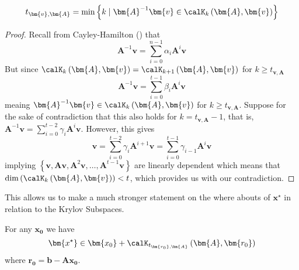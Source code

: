 \begin{cor} \label{theorem: grade_as_min}
    \[
        t_{\bm{v}, \bm{A}} = \min \left\{k \mid \bm{A}^{-1} \bm{v} \in \calK_{k} \left( \bm{A},\bm{v} \right) \right\}
    \]
\end{cor}
\begin{proof}
    Recall from Cayley-Hamilton () that
    \[
        \bm{A}^{-1} \bm{v} = \sum_{i=0}^{n-1} \alpha_{i} \bm{A}^{i} \bm{v}
    \]
    But since $\calK_{k} \left( \bm{A},\bm{v} \right) = \calK_{k+1} \left( \bm{A},\bm{v} \right)$ for $k \geq t_{\bm{v}, \bm{A}}$
    \[
        \bm{A}^{-1} \bm{v} = \sum_{i=0}^{t-1} \beta_{i} \bm{A}^{i} \bm{v}
    \]
    meaing $\bm{A}^{-1} \bm{v} \in \calK_{k} \left( \bm{A},\bm{v} \right)$ for $k \geq t_{\bm{v}, \bm{A}}$. Suppose for the sake of contradiction that this also holds for $k = t_{\bm{v}, \bm{A}} - 1$, that is, $\bm{A}^{-1} \bm{v} = \sum_{i=0}^{t-2} \gamma_{i} \bm{A}^{i} \bm{v}$. However, this gives
    \[
        \bm{v} = \sum_{i=0}^{t-2} \gamma_{i} \bm{A}^{i+1} \bm{v} = \sum_{i=0}^{t-1} \gamma_{i-1} \bm{A}^{i} \bm{v}
    \]
    implying $\left\{ \bm{v}, \bm{A} \bm{v}, \bm{A}^2 \bm{v}, \ldots , \bm{A}^{t-1} \bm{v} \right\}$ are linearly dependent which means that $\operatorname{dim} \left( \calK_{k} \left( \bm{A} , \bm{v} \right) \right) < t$, which provides us with our contradiction.
\end{proof}
This allows us to make a much stronger statement on the where abouts of $\bm{x^{\star}}$ in relation to the Krylov Subspaces.
\begin{cor} \label{theorem: sol_in_krylov}
    For any $\bm{x_0}$ we have
    \[
        \bm{x^{\star}} \in \bm{x_0} + \calK_{t_{\bm{r_0}, \bm{A}}} \left( \bm{A},\bm{r_0} \right)
    \]
    where $\bm{r_0} = \bm{b} - \bm{A} \bm{x_0}$.
\end{cor}